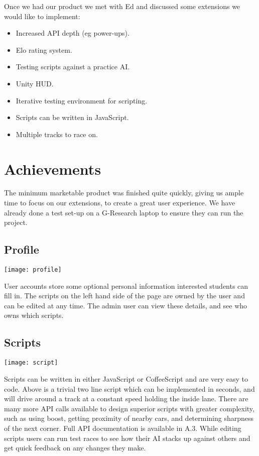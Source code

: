 Once we had our product we met with Ed and discussed some extensions we would like to implement:

\begin{itemize}
	\item Increased API depth (eg power-ups).
	\item Elo rating system.
	\item Testing scripts against a practice AI.
	\item Unity HUD.
	\item Iterative testing environment for scripting.
	\item Scripts can be written in JavaScript.
	\item Multiple tracks to race on.
\end{itemize}

\section{Achievements}

The minimum marketable product was finished quite quickly, giving us ample time to focus on our extensions, to create a great user experience. We have already done a test set-up on a G-Research laptop to ensure they can run the project.

\subsection{Profile}
\centerline{\texttt{[image: profile]}}
User accounts store some optional personal information interested students can fill in. The scripts on the left hand side of the page are owned by the user and can be edited at any time. The admin user can view these details, and see who owns which scripts.

\subsection{Scripts}
\centerline{\texttt{[image: script]}}
Scripts can be written in either JavaScript or CoffeeScript and are very easy to code. Above is a trivial two line script which can be implemented in seconds, and will drive around a track at a constant speed holding the inside lane. There are many more API calls available to design superior scripts with greater complexity, such as using boost, getting proximity of nearby cars, and determining sharpness of the next corner. Full API documentation is available in A.3. While editing scripts users can run test races to see how their AI stacks up against others and get quick feedback on any changes they make.

